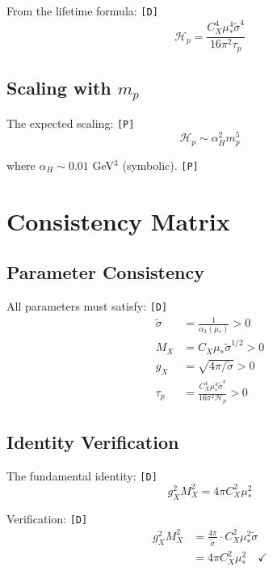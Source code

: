 \documentclass[11pt,a4paper]{article}
\newcommand{\tagD}{\textcolor{green!50!black}{\texttt{[D]}}}
\newcommand{\tagP}{\textcolor{orange!80!black}{\texttt{[P]}}}
\theoremstyle{definition}
\begin{document}
From the lifetime formula: \tagD{}
\begin{equation}
\label{eq:hp-from-tau}
\mathcal{H}_p = \frac{C_X^4\mu_*^4\tilde{\sigma}^4}{16\pi^2\tau_p}
\end{equation}

\subsection{Scaling with $m_p$}
\label{app:hp-scale}

The expected scaling: \tagP{}
\begin{equation}
\label{eq:hp-mp-scale}
\mathcal{H}_p \sim \alpha_H^2 m_p^5
\end{equation}

where $\alpha_H \sim 0.01$ GeV$^3$ (symbolic). \tagP{}

\section{Consistency Matrix}
\label{app:consistency}

\subsection{Parameter Consistency}
\label{app:param-cons}

All parameters must satisfy: \tagD{}
\begin{align}
\label{eq:param-cons-1}
\tilde{\sigma} &= \frac{1}{\alpha_3(\mu_*)} > 0 \\
\label{eq:param-cons-2}
M_X &= C_X \mu_* \tilde{\sigma}^{1/2} > 0 \\
\label{eq:param-cons-3}
g_X &= \sqrt{4\pi/\tilde{\sigma}} > 0 \\
\label{eq:param-cons-4}
\tau_p &= \frac{C_X^4\mu_*^4\tilde{\sigma}^4}{16\pi^2\mathcal{H}_p} > 0
\end{align}

\subsection{Identity Verification}
\label{app:identity}

The fundamental identity: \tagD{}
\begin{equation}
\label{eq:ident-1}
g_X^2 M_X^2 = 4\pi C_X^2 \mu_*^2
\end{equation}

Verification: \tagD{}
\begin{align}
\label{eq:ident-verify-1}
g_X^2 M_X^2 &= \frac{4\pi}{\tilde{\sigma}} \cdot C_X^2 \mu_*^2 \tilde{\sigma} \\
\label{eq:ident-verify-2}
&= 4\pi C_X^2 \mu_*^2 \quad \checkmark
\end{align}
\end{document}
